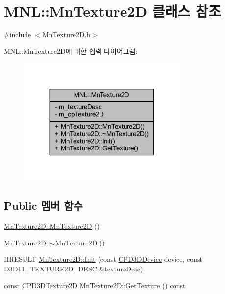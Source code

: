 \hypertarget{class_m_n_l_1_1_mn_texture2_d}{}\section{M\+NL\+:\+:Mn\+Texture2D 클래스 참조}
\label{class_m_n_l_1_1_mn_texture2_d}


{\ttfamily \#include $<$Mn\+Texture2\+D.\+h$>$}



M\+NL\+:\+:Mn\+Texture2\+D에 대한 협력 다이어그램\+:\nopagebreak
\begin{figure}[H]
\begin{center}
\leavevmode
\includegraphics[width=239pt]{class_m_n_l_1_1_mn_texture2_d__coll__graph}
\end{center}
\end{figure}
\subsection*{Public 멤버 함수}
\begin{DoxyCompactItemize}
\item 
\hyperlink{class_m_n_l_1_1_mn_texture2_d_a487782964ae4c1971e71fed3b637abf5}{Mn\+Texture2\+D\+::\+Mn\+Texture2D} ()
\item 
\hyperlink{class_m_n_l_1_1_mn_texture2_d_a74b4bb846168d1763009e09652585edd}{Mn\+Texture2\+D\+::$\sim$\+Mn\+Texture2D} ()
\item 
H\+R\+E\+S\+U\+LT \hyperlink{class_m_n_l_1_1_mn_texture2_d_a34ca4a63ce6c64977c71ab9929827d18}{Mn\+Texture2\+D\+::\+Init} (const \hyperlink{namespace_m_n_l_a1eec210db8f309a4a9ac0d9658784c31}{C\+P\+D3\+D\+Device} device, const D3\+D11\+\_\+\+T\+E\+X\+T\+U\+R\+E2\+D\+\_\+\+D\+E\+SC \&texture\+Desc)
\item 
const \hyperlink{namespace_m_n_l_addb538e1cbd1f443e6db5e6312487c51}{C\+P\+D3\+D\+Texture2D} \hyperlink{class_m_n_l_1_1_mn_texture2_d_aa74bb278ccb47dc102d692d67c6f856a}{Mn\+Texture2\+D\+::\+Get\+Texture} () const
\end{DoxyCompactItemize}
